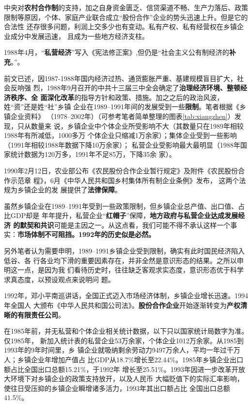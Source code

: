 中央对\textbf{农村合作制}的支持，加之自身资金匮乏、信贷渠道不畅、生产力落后、政策
限制等原因，个体、家庭产业联合成立“股份合作”企业的势头迅速上升。但是它的合法性
还存很多问题，利润上交多少也有变动。私有产权、私有经营权在乡镇企业成分中发展迅速，
且成为一些地方经济支柱。

1988年4月，“\textbf{私营经济}”写入《宪法修正案》,但仍是“社会主义公有制经济的\textbf{补
充}。”。

前文已述，因1987-1988年国内经济过热、通货膨胀严重、基建规模盲目扩大，社会反响强
烈，1988年9月召开的中共十三届三中全会确定了\textbf{治理经济环境、整顿经济秩序、全
  面深化改革}的指导方针和政策、措施。加之之后的政治风波，姓“资”还是姓“社”乡镇
企业在1989--1991年间的发展受到一些\textbf{限制}。笔者根据《乡镇企业资料》
（1978--2002年）（可参考笔者简单整理的图表\cref{tab:xiangzhen}）发现，只从数量来
说，乡镇企业中个体企业所受影响不大（其数量只在1989年相较1988年有所减低，1000多万
个体企业只缩减1万余家）；集体企业受到一些影响（1991年相较1988年数据下降10万余家）；
私营企业受影响最大最明显（1988年国家统计数据为120万多，1991年不足85万，下降35余
家）。

1990年2月12日，农业部公布《农民股份合作企业暂行规定》及附件《农民股份合作示范章
程》，6月《中华人民共和国乡村集体所有制企业条例》发布， 这两个法规为乡镇企业的发
展提供了\textbf{法律保障}。

虽然乡镇企业在1989--1991年受到一些政策限制，但乡镇企业总产值、出口值、占比GDP却是
年年提升，私营企业“\textbf{红帽子}”保障，\textbf{地方政府与私营企业达成发展经济
  的默契和共识}可能是主因之一。从这点看，我们可能不得不承认这样一个事
实：\textbf{市场体制不可阻挡。1992年的历史似是必然。}

另外笔者认为需要申明，1989--1991乡镇企业受到限制，确实有此时国民经济陷入低谷、各
行各业均下滑的重要因素存在，并非全然是意识形态的结果。之所以申明这一点，是因为我
们看待历史时，往往缺乏客观求实态度，意识形态优于科学求真态度，以预设观点来说明问
题。

1992年，邓小平南巡讲话，全国正式迈入市场经济体制，乡镇企业增长迅速。1994年全国人
大颁布《中华人民共和国公司法》。\textbf{股份合作企业}开始逐渐转变为\textbf{产权清
  晰的有限责任公司}。

在1985年前，并无私营和个体企业相关统计数据，以下只以国家统计局数字为准。仅1985年，
新加入统计表的私营企业53万余家，个体企业1012万余家。从1985到1993年的9年时间里，乡
镇企业就吸纳剩余劳动力9497万余人，平均一年过千万人；乡镇企业年增加产值占
比GDP从18.7\%增长至22.44\%。1985年乡镇企业出口额占比全国出口总额15.21\%，于1992年
增长至25.51\%。1993年因进一步改革开放大环境下对乡镇企业的政策支持放开，以及人民币
大幅贬值下的实际汇率影响，使往日受压抑的乡镇企业瞬增诸多活力，1993年其出口额占比
全国出口总额41.5\%。

